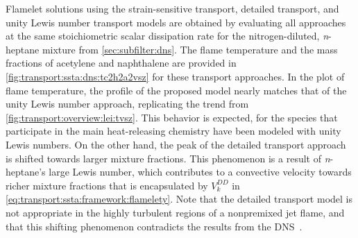 
Flamelet solutions using the strain-sensitive transport, detailed transport, and unity Lewis number transport models are obtained by evaluating all approaches at the same stoichiometric scalar dissipation rate for the nitrogen-diluted, \textit{n}-heptane mixture from \cref{sec:subfilter:dns}. The flame temperature and the mass fractions of acetylene and naphthalene are provided in \cref{fig:transport:ssta:dns:tc2h2a2vsz} for these transport approaches. In the plot of flame temperature, the profile of the proposed model nearly matches that of the unity Lewis number approach, replicating the trend from \cref{fig:transport:overview:lei:tvsz}. This behavior is expected, for the species that participate in the main heat-releasing chemistry have been modeled with unity Lewis numbers. On the other hand, the peak of the detailed transport approach is shifted towards larger mixture fractions. This phenomenon is a result of \textit{n}-heptane's large Lewis number, which contributes to a convective velocity towards richer mixture fractions that is encapsulated by $V_k^{DD}$ in \cref{eq:transport:ssta:framework:flamelety}. Note that the detailed transport model is not appropriate in the highly turbulent regions of a nonpremixed jet flame, and that this shifting phenomenon contradicts the results from the DNS~\cite{attili2016}.

